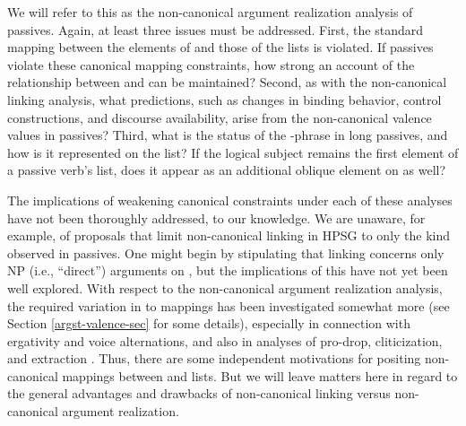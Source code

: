 \documentclass[output=paper
                ,modfonts
                ,nonflat
	        ,collection
	        ,collectionchapter
	        ,collectiontoclongg
 	        ,biblatex
                ,babelshorthands
                ,newtxmath
                ,draftmode
                ,colorlinks, citecolor=brown
]{./langsci/langscibook}
\begin{document}

We will refer to this as the non-canonical argument realization analysis of passives. Again, at least three 
issues must be addressed.
First, the standard mapping between the elements of \argst and those of the \val lists is violated.
If passives violate these canonical mapping constraints, how strong an account of the relationship between \argst and \val can be maintained?
Second, as with the non-canonical linking analysis, what predictions, such as changes in binding behavior, control constructions, and discourse availability, arise from the non-canonical valence values in passives?
Third, what is the status of the -phrase in long passives, and how is it represented on the \argst list?  If the logical subject remains the first element of a passive verb's \argst list, does it appear as an additional oblique element on \argst as well? 

The implications of weakening canonical constraints under each of these analyses have not been thoroughly addressed, to our knowledge.
We are unaware, for example, of proposals that limit non-canonical linking in HPSG to only the kind observed in passives.
One might begin by stipulating that linking concerns only NP (i.e., ``direct'') arguments on \argst, but the implications of this have not yet been well explored.
With respect to the non-canonical argument realization analysis, the required variation in \argst to \val mappings has been investigated somewhat more (see Section \ref{argst-valence-sec} for some details), especially in connection with ergativity and voice alternations, and also in analyses of pro-drop, cliticization, and extraction \citep{MillerandSag1997, Manning+Sag:1999, Boumaetal2001}.
Thus, there are some independent motivations for positing non-canonical mappings between \argst and \val lists.
But we will leave matters here in regard to the general advantages and drawbacks of non-canonical linking versus non-canonical argument realization.
\end{document}
